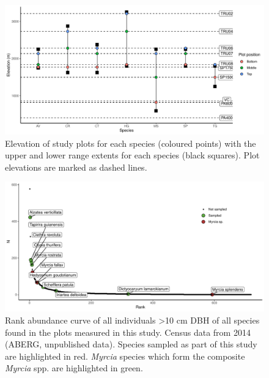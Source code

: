 \documentclass[a4paper, 11pt]{article}
\begin{document}

\begin{figure}[H]
\includegraphics[width=\textwidth]{ranges}
\centering
\caption{Elevation of study plots for each species (coloured points) with the upper and lower range extents for each species (black squares). Plot elevations are marked as dashed lines.}
\label{fig:ranges_ggplot}
\end{figure}




\begin{figure}[H]
\includegraphics[width=\textwidth]{rank_abund}
\centering
\caption{Rank abundance curve of all individuals \textgreater{}10 cm DBH of all species found in the plots measured in this study. Census data from 2014 (ABERG, unpublished data). Species sampled as part of this study are highlighted in red. \textit{Myrcia} species which form the composite \textit{Myrcia} spp. are highlighted in green.}
\label{fig:rank_abund}
\end{figure}
\end{document}
